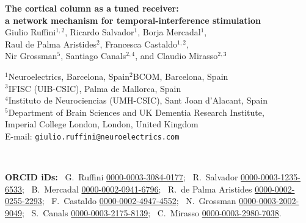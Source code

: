 \documentclass[a4paper]{article}
\newif\ifjne
\begin{document}
\ifjne
\begin{center}
{\Large\bfseries The cortical column as a tuned receiver:\\[2pt]
a network mechanism for temporal-interference stimulation}\\[8pt]
{\large Giulio Ruffini$^{1,2}$, Ricardo Salvador$^{1}$, Borja Mercadal$^{1}$,\\[2pt]
Raul de Palma Aristides$^{2}$, Francesca Castaldo$^{1,2}$,\\[2pt]
Nir Grossman$^{5}$, Santiago Canals$^{2,4}$, and Claudio Mirasso$^{2,3}$}\\[8pt]
\begin{minipage}{\textwidth}\centering\small
$^{1}$Neuroelectrics, Barcelona, Spain\qquad $^{2}$BCOM, Barcelona, Spain\\
$^{3}$IFISC (UIB-CSIC), Palma de Mallorca, Spain\\
$^{4}$Instituto de Neurociencias (UMH-CSIC), Sant Joan d'Alacant, Spain\\
$^{5}$Department of Brain Sciences and UK Dementia Research Institute,\\
Imperial College London, London, United Kingdom\\[4pt]
E-mail: \texttt{giulio.ruffini@neuroelectrics.com}
\end{minipage}\\[5pt]
\begin{minipage}{\textwidth}\centering\footnotesize\color{negray}
\textbf{ORCID iDs:}\ %
G.~Ruffini \href{https://orcid.org/0000-0003-3084-0177}{0000-0003-3084-0177};\ %
R.~Salvador \href{https://orcid.org/0000-0003-1235-6533}{0000-0003-1235-6533};\ %
B.~Mercadal \href{https://orcid.org/0000-0002-0941-6796}{0000-0002-0941-6796};\ %
R.~de Palma Aristides \href{https://orcid.org/0000-0002-0255-2293}{0000-0002-0255-2293};\ %
F.~Castaldo \href{https://orcid.org/0000-0002-4947-4552}{0000-0002-4947-4552};\ %
N.~Grossman \href{https://orcid.org/0000-0003-2002-9049}{0000-0003-2002-9049};\ %
S.~Canals \href{https://orcid.org/0000-0003-2175-8139}{0000-0003-2175-8139};\ %
C.~Mirasso \href{https://orcid.org/0000-0003-2980-7038}{0000-0003-2980-7038}.
\end{minipage}
\end{center}
\end{document}
